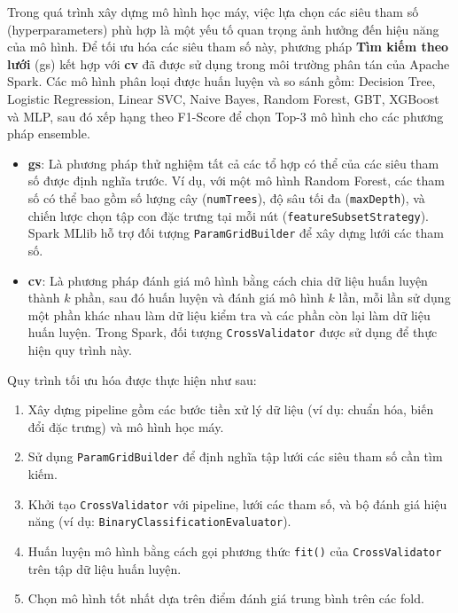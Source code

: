 Trong quá trình xây dựng mô hình học máy, việc lựa chọn các siêu tham số (hyperparameters) phù hợp là một yếu tố quan trọng ảnh hưởng đến hiệu năng của mô hình. Để tối ưu hóa các siêu tham số này, phương pháp \textbf{Tìm kiếm theo lưới} (\ac{gs}) kết hợp với \textbf{\ac{cv}} đã được sử dụng trong môi trường phân tán của Apache Spark. Các mô hình phân loại được huấn luyện và so sánh gồm: Decision Tree, Logistic Regression, Linear SVC, Naive Bayes, Random Forest, GBT, XGBoost và MLP, sau đó xếp hạng theo F1-Score để chọn Top-3 mô hình cho các phương pháp ensemble.

\begin{itemize}
    \item \textbf{\ac{gs}}: Là phương pháp thử nghiệm tất cả các tổ hợp có thể của các siêu tham số được định nghĩa trước. Ví dụ, với một mô hình Random Forest, các tham số có thể bao gồm số lượng cây (\texttt{numTrees}), độ sâu tối đa (\texttt{maxDepth}), và chiến lược chọn tập con đặc trưng tại mỗi nút (\texttt{featureSubsetStrategy}). Spark MLlib hỗ trợ đối tượng \texttt{ParamGridBuilder} để xây dựng lưới các tham số.
    
    \item \textbf{\ac{cv}}: Là phương pháp đánh giá mô hình bằng cách chia dữ liệu huấn luyện thành $k$ phần, sau đó huấn luyện và đánh giá mô hình $k$ lần, mỗi lần sử dụng một phần khác nhau làm dữ liệu kiểm tra và các phần còn lại làm dữ liệu huấn luyện. Trong Spark, đối tượng \texttt{CrossValidator} được sử dụng để thực hiện quy trình này.
\end{itemize}

Quy trình tối ưu hóa được thực hiện như sau:

\begin{enumerate}
    \item Xây dựng pipeline gồm các bước tiền xử lý dữ liệu (ví dụ: chuẩn hóa, biến đổi đặc trưng) và mô hình học máy.
    \item Sử dụng \texttt{ParamGridBuilder} để định nghĩa tập lưới các siêu tham số cần tìm kiếm.
    \item Khởi tạo \texttt{CrossValidator} với pipeline, lưới các tham số, và bộ đánh giá hiệu năng (ví dụ: \texttt{BinaryClassificationEvaluator}).
    \item Huấn luyện mô hình bằng cách gọi phương thức \texttt{fit()} của \texttt{CrossValidator} trên tập dữ liệu huấn luyện.
    \item Chọn mô hình tốt nhất dựa trên điểm đánh giá trung bình trên các fold.
\end{enumerate}

